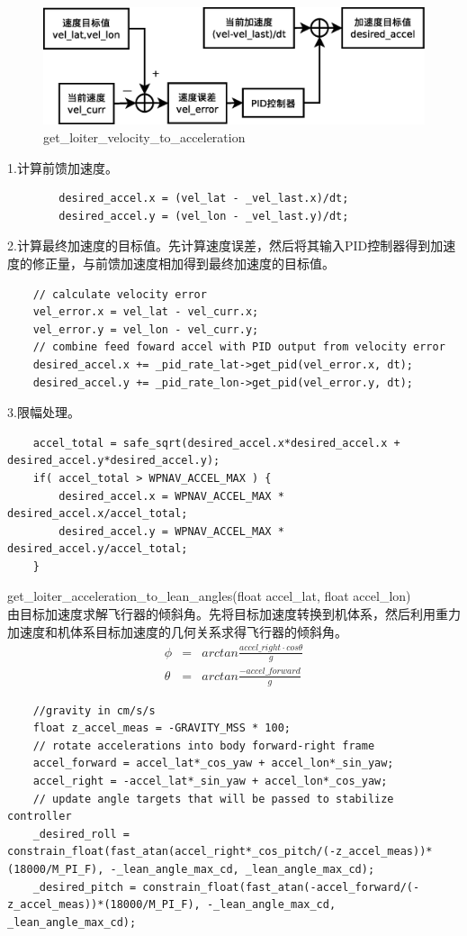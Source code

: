 \documentclass[a4paper,10pt]{ctexart} %
\begin{document}
\begin{figure}[!htb]\center
\includegraphics[scale=0.3]{get_loiter_velocity_to_acceleration.eps}
\caption{get\_loiter\_velocity\_to\_acceleration}\label{getloitervelocitytoacceleration}
\end{figure}
1.计算前馈加速度。
\begin{lstlisting}
        desired_accel.x = (vel_lat - _vel_last.x)/dt;
        desired_accel.y = (vel_lon - _vel_last.y)/dt;
\end{lstlisting}
2.计算最终加速度的目标值。先计算速度误差，然后将其输入PID控制器得到加速度的修正量，与前馈加速度相加得到最终加速度的目标值。
\begin{lstlisting}
    // calculate velocity error
    vel_error.x = vel_lat - vel_curr.x;
    vel_error.y = vel_lon - vel_curr.y;
    // combine feed foward accel with PID output from velocity error
    desired_accel.x += _pid_rate_lat->get_pid(vel_error.x, dt);
    desired_accel.y += _pid_rate_lon->get_pid(vel_error.y, dt);
\end{lstlisting}
3.限幅处理。
\begin{lstlisting}
    accel_total = safe_sqrt(desired_accel.x*desired_accel.x + desired_accel.y*desired_accel.y);
    if( accel_total > WPNAV_ACCEL_MAX ) {
        desired_accel.x = WPNAV_ACCEL_MAX * desired_accel.x/accel_total;
        desired_accel.y = WPNAV_ACCEL_MAX * desired_accel.y/accel_total;
    }
\end{lstlisting}

\vspace{8pt}
\noindent get\_loiter\_acceleration\_to\_lean\_angles(float accel\_lat, float accel\_lon)\\
由目标加速度求解飞行器的倾斜角。先将目标加速度转换到机体系，然后利用重力加速度和机体系目标加速度的几何关系求得飞行器的倾斜角。
\begin{eqnarray}
\phi	& = & arctan{\frac{accel\_right\cdot cos\theta}{g}}\\ \nonumber
\theta	& = & arctan{\frac{-accel\_forward}{g}}
\end{eqnarray}
\begin{lstlisting}
    //gravity in cm/s/s
    float z_accel_meas = -GRAVITY_MSS * 100;
    // rotate accelerations into body forward-right frame
    accel_forward = accel_lat*_cos_yaw + accel_lon*_sin_yaw;
    accel_right = -accel_lat*_sin_yaw + accel_lon*_cos_yaw;
    // update angle targets that will be passed to stabilize controller
    _desired_roll = constrain_float(fast_atan(accel_right*_cos_pitch/(-z_accel_meas))*(18000/M_PI_F), -_lean_angle_max_cd, _lean_angle_max_cd);
    _desired_pitch = constrain_float(fast_atan(-accel_forward/(-z_accel_meas))*(18000/M_PI_F), -_lean_angle_max_cd, _lean_angle_max_cd);
\end{lstlisting}
\end{document}
